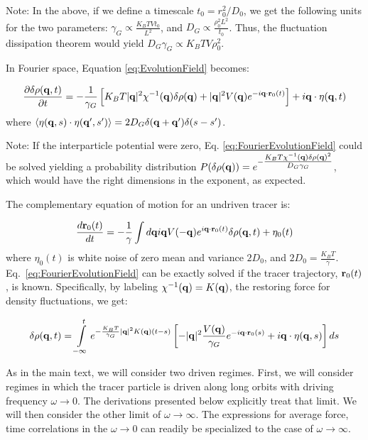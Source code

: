 \documentclass[amsmath,preprintnumbers,10pt,article,notitlepage]{revtex4-1}
\begin{document}
Note:  In the above, if we define a timescale $t_0 = r_0^2/D_0$, we get the following units for the two parameters: $\gamma_G \propto \frac{K_BT V t_0}{L^2}$, and $D_G \propto  \frac{\rho_0^2L^2}{t_0}$.  Thus, the fluctuation dissipation theorem would yield $D_G \gamma_G \propto K_BT V \rho_0^2$.

In Fourier space, Equation \ref{eq:EvolutionField} becomes:

\begin{equation}
\frac{\partial \delta \rho({\bf q},t)}{\partial t}= -\dfrac{1}{\gamma_G}\left[ K_BT |{\bf q}|^2 \chi^{-1}({\bf q}) \delta \rho({\bf q}) +  |{\bf q}|^2 V({\bf q}) e^{-i {\bf q} \cdot {\bf r}_0(t)} \right] + i{\bf q} \cdot \eta({\bf q},t)
\label{eq:FourierEvolutionField}
\end{equation}
where $\langle \eta({\bf q}, s) \cdot \eta({\bf q}', s')  \rangle = 2D_G \delta({\bf q} + {\bf q}') \delta(s-s')$.

Note:  If the interparticle potential were zero, Eq. \ref{eq:FourierEvolutionField} could be solved yielding a probability distribution $P(\delta \rho({\bf q})) = e^{-\tfrac{K_BT \chi^{-1}({\bf q}) \delta \rho({\bf q})^2}{D_G \gamma_G}}$, which would have the right dimensions in the exponent, as expected.

The complementary equation of motion for an undriven tracer is:

\begin{equation}
\dfrac{d{\bf r}_0(t)}{d t} = -\dfrac{1}{\gamma} \int  d{\bf q} i {\bf q} V(-{\bf q})e^{i{\bf q} \cdot {\bf r}_0(t)} \delta \rho({\bf q}, t) +  \eta_0(t)
\label{eq:EvolutionTracer}
\end{equation}
where $\eta_0(t)$ is white noise of zero mean and variance $2D_0$, and $2D_0 = \frac{K_BT}{\gamma}$.
Eq.~\ref{eq:FourierEvolutionField} can be exactly solved if the tracer trajectory, ${\bf r}_0(t)$, is known. Specifically, by labeling $\chi^{-1}({\bf q}) = K({\bf q})$, the restoring force for density fluctuations, we get:

\begin{equation}
\delta\rho({\bf q},t)=
\int\limits_{-\infty}^t e^{-\frac{K_BT}{\gamma_G}|{\bf q}|^2 K({\bf q})(t-s)}\left[-|{\bf q}|^2 \dfrac{V({\bf q})}{\gamma_G} e^{-i {\bf q}\cdot {\bf r}_0(s)}+  i{\bf q} \cdot \eta({\bf q},s)\right] ds
\label{eq:SolutionFourierEvolution}
\end{equation}

As in the main text, we will consider two driven regimes. First, we will consider regimes in which the tracer particle is driven along long orbits with driving frequency $\omega \rightarrow 0$. The derivations presented below explicitly treat that limit. We will then consider the other limit of $\omega \rightarrow \infty$. The expressions for average force, time correlations in the $\omega \rightarrow 0$ can readily be specialized to the case of $\omega \rightarrow \infty$. 
\end{document}
